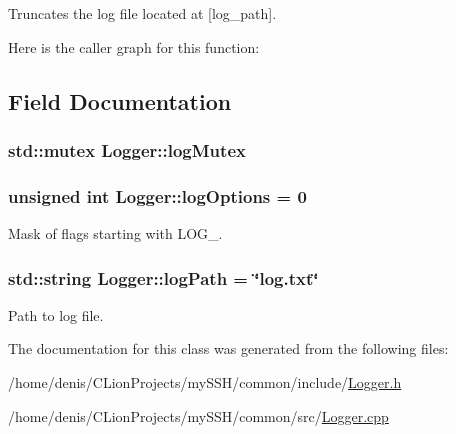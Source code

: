 Truncates the log file located at \mbox{[}log\+\_\+path\mbox{]}. 



Here is the caller graph for this function\+:




\subsection{Field Documentation}
\subsubsection[{\texorpdfstring{log\+Mutex}{logMutex}}]{\setlength{\rightskip}{0pt plus 5cm}std\+::mutex Logger\+::log\+Mutex\hspace{0.3cm}{\ttfamily [static]}}\hypertarget{classLogger_a1a7f5dc4185f8bff7778f1d6aa8525a9}{}\label{classLogger_a1a7f5dc4185f8bff7778f1d6aa8525a9}
\subsubsection[{\texorpdfstring{log\+Options}{logOptions}}]{\setlength{\rightskip}{0pt plus 5cm}unsigned int Logger\+::log\+Options = 0\hspace{0.3cm}{\ttfamily [static]}}\hypertarget{classLogger_a60d0eaf4eece8b505c52c6302048a9c1}{}\label{classLogger_a60d0eaf4eece8b505c52c6302048a9c1}


Mask of flags starting with L\+O\+G\+\_\+. 

\subsubsection[{\texorpdfstring{log\+Path}{logPath}}]{\setlength{\rightskip}{0pt plus 5cm}std\+::string Logger\+::log\+Path = \char`\"{}log.\+txt\char`\"{}\hspace{0.3cm}{\ttfamily [static]}}\hypertarget{classLogger_af2d3e37c3764663b3e103f0fc2003cb6}{}\label{classLogger_af2d3e37c3764663b3e103f0fc2003cb6}


Path to log file. 



The documentation for this class was generated from the following files\+:\begin{DoxyCompactItemize}
\item 
/home/denis/\+C\+Lion\+Projects/my\+S\+S\+H/common/include/\hyperlink{Logger_8h}{Logger.\+h}\item 
/home/denis/\+C\+Lion\+Projects/my\+S\+S\+H/common/src/\hyperlink{Logger_8cpp}{Logger.\+cpp}\end{DoxyCompactItemize}
